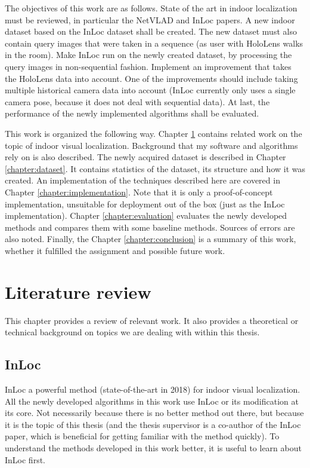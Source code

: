 \documentclass[twoside]{ctuthesis}
\theoremstyle{plain}
\theoremstyle{definition}
\theoremstyle{note}
\begin{document}
The objectives of this work are as follows. State of the art in indoor localization must be reviewed, in particular the NetVLAD \cite{Arandjelovic16} and InLoc \cite{taira2018inloc} papers. A new indoor dataset based on the InLoc dataset \cite{taira2018inloc} shall be created. The new dataset must also contain query images that were taken in a sequence (as user with HoloLens walks in the room). Make InLoc run on the newly created dataset, by processing the query images in non-sequential fashion. Implement an improvement that takes the HoloLens data into account. One of the improvements should include taking multiple historical camera data into account (InLoc currently only uses a single camera pose, because it does not deal with sequential data). At last, the performance of the newly implemented algorithms shall be evaluated.

This work is organized the following way. Chapter \ref{chapter:literature-review} contains related work on the topic of indoor visual localization. Background that my software and algorithms rely on is also described. The newly acquired dataset is described in Chapter \ref{chapter:dataset}. It contains statistics of the dataset, its structure and how it was created. An implementation of the techniques described here are covered in Chapter \ref{chapter:implementation}. Note that it is only a proof-of-concept implementation, unsuitable for deployment out of the box (just as the InLoc implementation). Chapter \ref{chapter:evaluation} evaluates the newly developed methods and compares them with some baseline methods. Sources of errors are also noted. Finally, the Chapter \ref{chapter:conclusion} is a summary of this work, whether it fulfilled the assignment and possible future work.

\chapter{Literature review}
\label{chapter:literature-review}

This chapter provides a review of relevant work. It also provides a theoretical or technical background on topics we are dealing with within this thesis.

\section{InLoc}
InLoc \cite{taira2018inloc} a powerful method (state-of-the-art in 2018) for indoor visual localization. All the newly developed algorithms in this work use InLoc or its modification at its core. Not necessarily because there is no better method out there, but because it is the topic of this thesis (and the thesis supervisor is a co-author of the InLoc paper, which is beneficial for getting familiar with the method quickly). To understand the methods developed in this work better, it is useful to learn about InLoc first.
\end{document}
